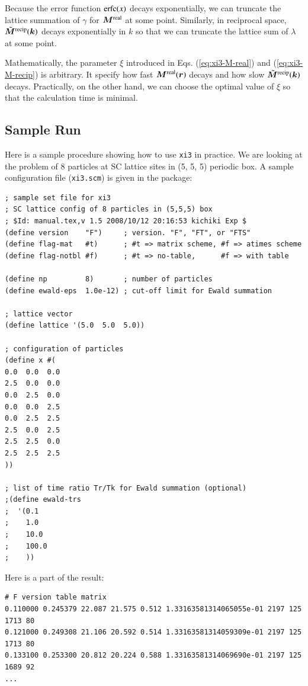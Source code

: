 \documentclass{book}
\begin{document}
Because the error function ${\rm erfc}(x)$ decays exponentially,
we can truncate the lattice summation of $\gamma$ for $\bm{M}^{\rm real}$
at some point.
Similarly, in reciprocal space, $\tilde{\bm{M}}^{\rm recip}(\bm{k})$
decays exponentially in $k$ so that we can truncate the lattice sum
of $\lambda$ at some point.

Mathematically, the parameter $\xi$ introduced in
Eqs. (\ref{eq:xi3-M-real}) and (\ref{eq:xi3-M-recip})
is arbitrary. It specify how fast $\bm{M}^{\rm real}(\bm{r})$ decays
and how slow $\tilde{\bm{M}}^{\rm recip}(\bm{k})$ decays.
Practically, on the other hand, we can choose the optimal value of $\xi$
so that the calculation time is minimal.


\subsection{Sample Run}
Here is a sample procedure showing how to use {\tt xi3} in practice.
We are looking at the problem of 8 particles at SC lattice sites
in (5, 5, 5) periodic box.
A sample configuration file ({\tt xi3.scm}) is given in the package:
{\small
\begin{verbatim}
; sample set file for xi3
; SC lattice config of 8 particles in (5,5,5) box
; $Id: manual.tex,v 1.5 2008/10/12 20:16:53 kichiki Exp $
(define version    "F")     ; version. "F", "FT", or "FTS"
(define flag-mat   #t)      ; #t => matrix scheme, #f => atimes scheme
(define flag-notbl #f)      ; #t => no-table,      #f => with table

(define np         8)       ; number of particles
(define ewald-eps  1.0e-12) ; cut-off limit for Ewald summation

; lattice vector
(define lattice '(5.0  5.0  5.0))

; configuration of particles
(define x #(
0.0  0.0  0.0
2.5  0.0  0.0
0.0  2.5  0.0
0.0  0.0  2.5
0.0  2.5  2.5
2.5  0.0  2.5
2.5  2.5  0.0
2.5  2.5  2.5
))

; list of time ratio Tr/Tk for Ewald summation (optional)
;(define ewald-trs
;  '(0.1
;    1.0
;    10.0
;    100.0
;    ))
\end{verbatim}
}
Here is a part of the result:
{\small
\begin{verbatim}
# F version table matrix
0.110000 0.245379 22.087 21.575 0.512 1.33163581314065055e-01 2197 125 1713 80
0.121000 0.249308 21.106 20.592 0.514 1.33163581314059309e-01 2197 125 1713 80
0.133100 0.253300 20.812 20.224 0.588 1.33163581314069690e-01 2197 125 1689 92
...
\end{verbatim}
}
\end{document}
